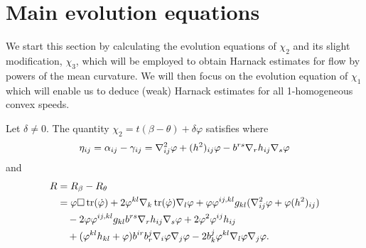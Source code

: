 \documentclass{amsart}
\begin{document}
\section{Main evolution equations}
We start this section by calculating the evolution equations of $\chi_2$ and its slight modification, $\chi_3$, which will be employed to obtain Harnack estimates for flow by powers of the mean curvature. We will then focus on the evolution equation of $\chi_1$ which will enable us to deduce (weak) Harnack estimates for all 1-homogeneous convex speeds.
\begin{proposition}
\label{thm:Evchi}
Let $\delta \neq 0.$ The quantity
$
\chi_2 = t(\beta - \theta) + \delta\varphi
$
satisfies
where
\[
\eta_{ij} = \alpha_{ij} - \gamma_{ij} = \nabla^2_{ij}\varphi + (h^2)_{ij}\varphi - b^{rs}\nabla_r h_{ij}\nabla_s \varphi
\]
and
\[
\begin{split}
R &= R_{\beta} - R_{\theta} \\
&= \varphi \Box \operatorname{tr}(\dot{\varphi}) + 2\varphi^{kl} \nabla_k \operatorname{tr}(\dot{\varphi}) \nabla_l \varphi + \varphi \varphi^{ij,kl}g_{kl} (\nabla^2_{ij} \varphi + \varphi(h^2)_{ij})\\ 
&\quad- 2\varphi \varphi^{ij,kl}g_{kl} b^{rs}\nabla_r h_{ij}\nabla_s \varphi + 2\varphi^{2}\varphi^{ij}h_{ij}\\
&\quad  +(\varphi^{kl}h_{kl} + \varphi)b^{ir}b^{j}_{r}\nabla_i \varphi\nabla_j\varphi - 2 b^{j}_{k}\varphi^{kl}\nabla_l\varphi\nabla_j\varphi.
\end{split}
\]

\end{proposition}
\end{document}
